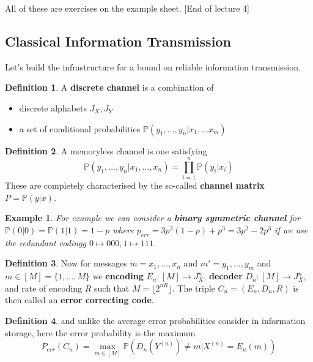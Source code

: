 \documentclass{article}
\newtheorem{example}{Example}
\theoremstyle{definition}
\newtheorem{definition}{Definition}
\begin{document}
All of these are exercises on the example sheet. [End of lecture 4]

\subsection{Classical Information Transmission}

Let's build the infrastructure for a bound on reliable information transmission.

\begin{definition}
  A \textbf{discrete channel} is a combination of
  \begin{itemize}
  \item discrete alphabets $J_X, J_Y$
  \item a set of conditional probabilities $\mathbb{P}(y_1, \dots, y_n | x_1,
    \dots x_m)$
  \end{itemize}
\end{definition}

\begin{definition}
  A memoryless channel is one satisfying
  \begin{equation}
    \mathbb{P}(y_1, \dots, y_n | x_1, \dots, x_n) = \prod_{i = 1}^n \mathbb{P}(y_i | x_i)
  \end{equation}
  These are completely characterised by the so-called \textbf{channel matrix} $P =
  \mathbb{P}(y | x)$.
\end{definition}

\begin{example}
  For example we can consider a \textbf{binary symmetric channel} for
  $\mathbb{P}(0 | 0) = \mathbb{P}(1 | 1) = 1 - p$ where $p_{err} = 3p^2(1 - p) +
  p^3 = 3p^2 - 2p^3$ if we use the redundant codingg $0 \mapsto 000, 1 \mapsto
  111$.
\end{example}

\begin{definition}
  Now for messages $m=x_1, \dots, x_n$ and $m'=y_1, \dots, y_m$ and $m \in [M] =
  \{1, \dots, M\}$ we \textbf{encoding} $E_n : [M] \to J_X^n$, \textbf{decoder}
  $D_n : [M] \to J_X^n$, and rate of encoding $R$ such that $M = \lfloor 2^{nR}
  \rfloor$. The triple $C_n = (E_n, D_n, R)$ is then called an \textbf{error
    correcting code}.
\end{definition}

\begin{definition}
  and unlike the average error probabilities consider in information storage,
  here the error probability is the maximum
  \begin{equation}
    P_{err}(C_n) = \max_{m \in [M]} \mathbb{P}(D_n(Y^{(n)}) \neq m | X^{(n)} = E_n(m))
  \end{equation}
\end{definition}
\end{document}
